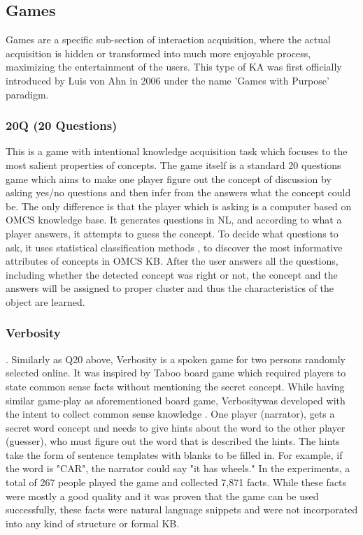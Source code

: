 \subsection{Games}
Games are a specific sub-section of interaction acquisition, where the actual
acquisition is hidden or transformed into much more enjoyable process, 
maximizing the entertainment of the users. This type of KA was first 
officially introduced by Luis von Ahn in 2006 \parencite{VonAhn2006,
VonAhn2008} under the name 'Games with Purpose' paradigm.

\subsubsection{20Q (20 Questions)} 
This is a game with intentional knowledge acquisition task
which focuses to the most salient properties of concepts. The game itself is
a standard 20 questions game which aims to make one player figure out the 
concept of discussion by asking yes/no questions and then infer from the 
answers what the concept could be. The only difference is that the player which
is asking is a computer based on OMCS knowledge base. It generates questions in
NL, and according to what a player answers, it attempts to guess the concept.
To decide what questions to ask, it uses statistical classification methods
\parencite{Speer2009}, to discover the most informative attributes of concepts
in OMCS KB. After the user answers all the questions, including whether the
detected concept was right or not, the concept and the answers will be assigned
to proper cluster and thus the characteristics of the object are learned.

\subsubsection{Verbosity}. 
Similarly as Q20 above, Verbosity is a spoken game for two 
persons randomly selected online. It was inspired by Taboo board 
game\parencite{TabooGame} which required players to state common sense facts
without mentioning the secret concept. While having similar game-play as 
aforementioned board game, Verbositywas developed with the intent to collect
common sense knowledge \parencite{VonAhn2006a}. One player (narrator), gets
a secret word concept and needs to give hints about the word to the other 
player (guesser), who must figure out the word that is described the hints.
The hints take the form of sentence templates with blanks to be filled in. 
For example, if the word is "CAR", the narrator could say "it has wheels."
In the experiments, a total of 267 people played the game and collected
7,871 facts. While these facts were mostly a good quality and it was proven
that the game can be used successfully, these facts were natural language 
snippets and were not incorporated into any kind of structure or formal KB. 

